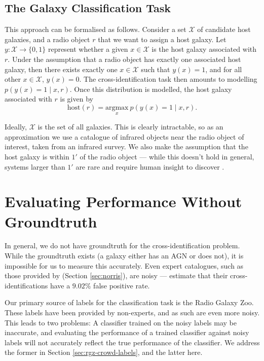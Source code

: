   \subsection{The Galaxy Classification Task}
  \label{sec:galaxy-classification-task}

    This approach can be formalised as follows. Consider a set $\mathcal X$ of
    candidate host galaxies, and a radio object $r$ that we want to assign a
    host galaxy. Let $y : \mathcal X \to \{0, 1\}$ represent whether a given $x
    \in \mathcal X$ is the host galaxy associated with $r$. Under the assumption
    that a radio object has exactly one associated host galaxy, then there
    exists exactly one $x \in \mathcal X$ such that $y(x) = 1$, and for all
    other $x \in \mathcal X$, $y(x) = 0$. The cross-identification task then
    amounts to modelling $p(y(x) = 1 \mid x, r)$. Once this distribution is
    modelled, the host galaxy associated with $r$ is given by
    \begin{equation}
        \label{eq:cross-identification}
        \mbox{host}(r) = \underset{x}{\mbox{argmax}}\ p(y(x) = 1 \mid x, r).
    \end{equation}

    Ideally, $\mathcal X$ is the set of all galaxies. This is clearly
    intractable, so as an approximation we use a catalogue of infrared objects
    near the radio object of interest, taken from an infrared survey. We also
    make the assumption that the host galaxy is within $1'$ of the radio object
    --- while this doesn't hold in general, systems larger than $1'$ are rare
    and require human insight to discover \citep{banfield16}.

\section{Evaluating Performance Without Groundtruth}
  \label{sec:norris-as-groundtruth}

  In general, we do not have groundtruth for the cross-identification problem.
  While the groundtruth exists (a galaxy either has an AGN or does not), it is
  impossible for us to measure this accurately. Even expert catalogues, such as
  those provided by \citeauthor{norris06} (Section \ref{sec:norris}), are noisy
  --- \citep{norris06} estimate that their cross-identifications have a $9.02\%$
  false positive rate.
  
  Our primary source of labels for the classification task is the Radio Galaxy
  Zoo. These labels have been provided by non-experts, and as such are even more
  noisy. This leads to two problems: A classifier trained on the noisy labels
  may be inaccurate, and evaluating the performance of a trained classifier
  against noisy labels will not accurately reflect the true performance of the
  classifier. We address the former in Section \ref{sec:rgz-crowd-labels}, and
  the latter here.

